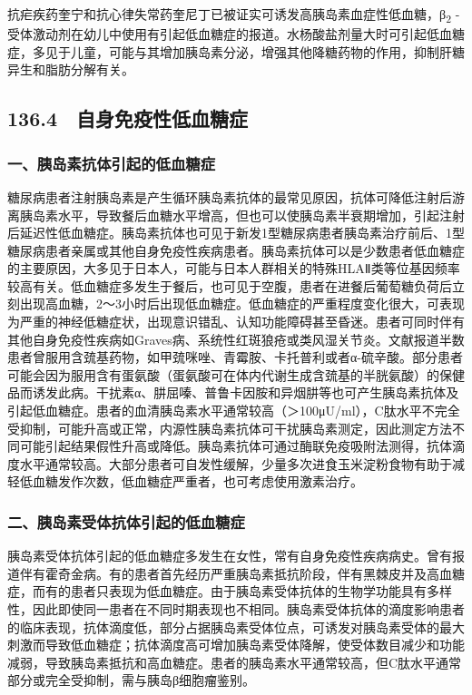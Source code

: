 抗疟疾药奎宁和抗心律失常药奎尼丁已被证实可诱发高胰岛素血症性低血糖，β\textsubscript{2}
-受体激动剂在幼儿中使用有引起低血糖症的报道。水杨酸盐剂量大时可引起低血糖症，多见于儿童，可能与其增加胰岛素分泌，增强其他降糖药物的作用，抑制肝糖异生和脂肪分解有关。

\subsection{136.4　自身免疫性低血糖症}

\subsubsection{一、胰岛素抗体引起的低血糖症}

糖尿病患者注射胰岛素是产生循环胰岛素抗体的最常见原因，抗体可降低注射后游离胰岛素水平，导致餐后血糖水平增高，但也可以使胰岛素半衰期增加，引起注射后延迟性低血糖症。胰岛素抗体也可见于新发1型糖尿病患者胰岛素治疗前后、1型糖尿病患者亲属或其他自身免疫性疾病患者。胰岛素抗体可以是少数患者低血糖症的主要原因，大多见于日本人，可能与日本人群相关的特殊HLAⅡ类等位基因频率较高有关。低血糖症多发生于餐后，也可见于空腹，患者在进餐后葡萄糖负荷后立刻出现高血糖，2～3小时后出现低血糖症。低血糖症的严重程度变化很大，可表现为严重的神经低糖症状，出现意识错乱、认知功能障碍甚至昏迷。患者可同时伴有其他自身免疫性疾病如Graves病、系统性红斑狼疮或类风湿关节炎。文献报道半数患者曾服用含巯基药物，如甲巯咪唑、青霉胺、卡托普利或者α-硫辛酸。部分患者可能会因为服用含有蛋氨酸（蛋氨酸可在体内代谢生成含巯基的半胱氨酸）的保健品而诱发此病。干扰素α、肼屈嗪、普鲁卡因胺和异烟肼等也可产生胰岛素抗体及引起低血糖症。患者的血清胰岛素水平通常较高（＞100μU/ml），C肽水平不完全受抑制，可能升高或正常，内源性胰岛素抗体可干扰胰岛素测定，因此测定方法不同可能引起结果假性升高或降低。胰岛素抗体可通过酶联免疫吸附法测得，抗体滴度水平通常较高。大部分患者可自发性缓解，少量多次进食玉米淀粉食物有助于减轻低血糖发作次数，低血糖症严重者，也可考虑使用激素治疗。

\subsubsection{二、胰岛素受体抗体引起的低血糖症}

胰岛素受体抗体引起的低血糖症多发生在女性，常有自身免疫性疾病病史。曾有报道伴有霍奇金病。有的患者首先经历严重胰岛素抵抗阶段，伴有黑棘皮并及高血糖症，而有的患者只表现为低血糖症。由于胰岛素受体抗体的生物学功能具有多样性，因此即使同一患者在不同时期表现也不相同。胰岛素受体抗体的滴度影响患者的临床表现，抗体滴度低，部分占据胰岛素受体位点，可诱发对胰岛素受体的最大刺激而导致低血糖症；抗体滴度高可增加胰岛素受体降解，使受体数目减少和功能减弱，导致胰岛素抵抗和高血糖症。患者的胰岛素水平通常较高，但C肽水平通常部分或完全受抑制，需与胰岛β细胞瘤鉴别。

